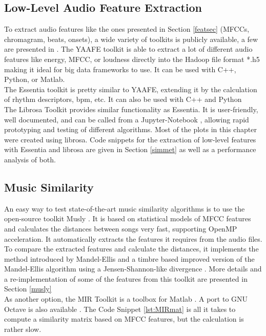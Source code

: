 \subsection{Low-Level Audio Feature Extraction}
To extract audio features like the ones presented in Section \ref{featsec} (MFCCs, chromagram, beats, onsets), a wide variety of toolkits is publicly available, a few are presented in \cite{audiofeattoolb}.
The YAAFE toolkit \cite{yaafe1} is able to extract a lot of different audio features like energy, MFCC, or loudness directly into the Hadoop file format *.h5 making it ideal for big data frameworks to use. It can be used with C++, Python, or Matlab.\\
The Essentia toolkit \cite{essentia1} is pretty similar to YAAFE, extending it by the calculation of rhythm descriptors, bpm, etc. It can also be used with C++ and Python\\
The Librosa Toolkit provides similar functionality \cite{labrosa1} as Essentia. It is user-friendly, well documented, and can be called from a Jupyter-Notebook \cite{jupyter}, allowing rapid prototyping and testing of different algorithms. Most of the plots in this chapter were created using librosa. Code snippets for the extraction of low-level features with Essentia and librosa are given in Section \ref{simmet} as well as a performance analysis of both.\\

\subsection{Music Similarity}

An easy way to test state-of-the-art music similarity algorithms is to use the open-source toolkit Musly \cite{musly1}. It is based on statistical models of MFCC features and calculates the distances between songs very fast, supporting OpenMP acceleration. It automatically extracts the features it requires from the audio files. To compare the extracted features and calculate the distances, it implements the method introduced by Mandel-Ellis \cite{mandelellis1} and a timbre based improved version of the Mandel-Ellis algorithm using a Jensen-Shannon-like divergence \cite{musly2}. More details and a re-implementation of some of the features from this toolkit are presented in Section \ref{musly}\\
As another option, the MIR Toolkit \cite{mirtoolbox1} is a toolbox for Matlab \cite{matl1}. A port to GNU Octave \cite{octave1} is also available \cite{mirtoolbox2}. The Code Snippet \ref{lst:MIRmat} is all it takes to compute a similarity matrix based on MFCC features, but the calculation is rather slow.

